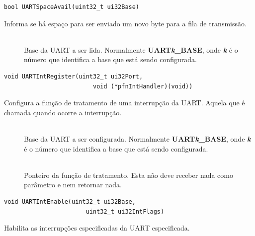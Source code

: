 \begin{lstlisting}[style=funcao]
	bool UARTSpaceAvail(uint32_t ui32Base)
\end{lstlisting}

Informa se há espaço para ser enviado um novo byte para a fila de transmissão.

\begin{description}
	\item []\hfill \\
	Base da UART a ser lida. Normalmente \textbf{UART\emph{k}\_BASE}, onde \textbf{\emph{k}} é o número que identifica a base que está sendo configurada.
\end{description}

\begin{lstlisting}[style=funcao]
	void UARTIntRegister(uint32_t ui32Port,
						 void (*pfnIntHandler)(void))
\end{lstlisting}

Configura a função de tratamento de uma interrupção da UART. Aquela que é chamada quando ocorre a interrupção.

\begin{description}
	\item []\hfill \\
	Base da UART a ser configurada. Normalmente \textbf{UART\emph{k}\_BASE}, onde \textbf{\emph{k}} é o número que identifica a base que está sendo configurada.
	
	\item []\hfill \\
	Ponteiro da função de tratamento. Esta não deve receber nada como parâmetro e nem retornar nada.
\end{description}

\begin{lstlisting}[style=funcao]
	void UARTIntEnable(uint32_t ui32Base,
					   uint32_t ui32IntFlags)
\end{lstlisting}

Habilita as interrupções especificadas da UART especificada.


